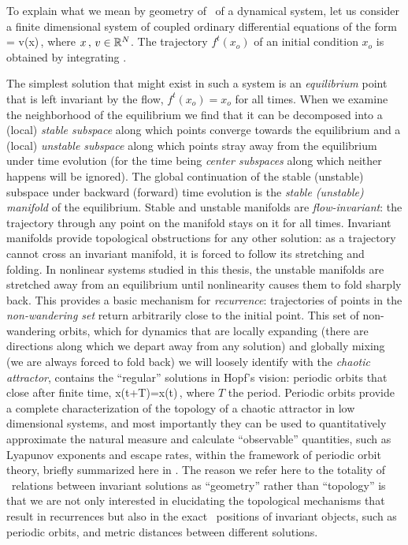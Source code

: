 To explain what we mean by geometry of \statesp\ of a dynamical
system, let us consider a finite dimensional system of coupled
ordinary differential equations of the form
\beq
	 = v(x)\,,
\label{eq:diffEqIntro}
\eeq
where $x\,,\, v \in \mathbb{R}^{N}$. The trajectory $f^{t}(x_o)$ of an initial
condition $x_o$ is obtained by integrating .

The simplest solution that might exist in such a system is an
\emph{equilibrium} point that is left invariant by the flow,
$f^t(x_o)=x_o$ for all times. When we examine the
neighborhood of the equilibrium we find that it can be
decomposed into a (local) \emph{stable subspace} along which
points converge towards the equilibrium and a (local)
\emph{unstable subspace} along which points stray away from
the equilibrium under time evolution (for the time being
\emph{center subspaces} along which neither happens will be
ignored). The global continuation of the stable (unstable)
subspace under backward (forward) time evolution is the
\emph{stable (unstable) manifold} of the equilibrium. Stable
and unstable manifolds are \emph{flow-invariant}: the
trajectory through any point on the manifold stays on it for
all times. Invariant manifolds provide topological
obstructions for any other solution: as a trajectory cannot
cross an invariant manifold, it is forced to follow its
stretching and folding. In nonlinear systems studied in this
thesis, the unstable manifolds are stretched away from
an equilibrium until nonlinearity causes them to fold sharply
back. This provides a basic mechanism for
\emph{recurrence}: trajectories of points in the \emph{non-wandering
set} return arbitrarily close to the initial point.
This set of non-wandering orbits,
which for dynamics that are locally expanding (there are directions along
which we depart away from any solution) and globally mixing (we are always forced
to fold back) we will loosely identify with the \emph{chaotic attractor},
contains the ``regular'' solutions in Hopf's vision: periodic orbits
that close after finite time,
\beq
	x(t+T)=x(t)\,,
\eeq
where $T$ the period. Periodic orbits provide a complete
characterization of the topology of a chaotic attractor in
low dimensional systems, and most importantly
they can be used to quantitatively approximate the natural
measure and calculate ``observable'' quantities, such as
Lyapunov exponents and escape rates, within the framework of
periodic orbit theory, briefly summarized here in
. The reason we refer here to the totality
of \statesp\ relations between invariant solutions as
``geometry'' rather than ``topology'' is that we are not only
interested in elucidating the topological mechanisms that
result in recurrences but also in the exact \statesp\
positions of invariant objects, such as periodic orbits, and
metric distances between different solutions.

